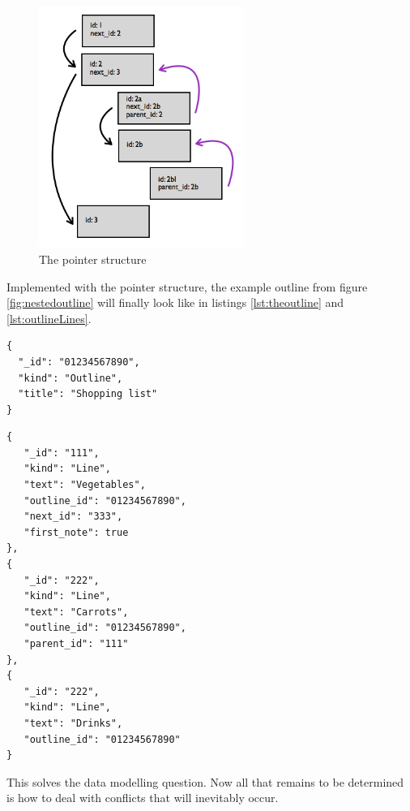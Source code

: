 \medskip
\begin{figure}[H] 
  \begin{center}
    \includegraphics[width=0.6\textwidth]{grafik/pointer} 
  \end{center}
  \caption{The pointer structure}
  \label{fig:pointer}
\end{figure}


Implemented with the pointer structure, the example outline from figure \ref{fig:nestedoutline} will finally look like in listings \ref{lst:theoutline} and \ref{lst:outlineLines}. 

\medskip
\begin{lstlisting}[caption=Chosen implementation of an outline, label={lst:theoutline}]
{
  "_id": "01234567890",
  "kind": "Outline",
  "title": "Shopping list"
}
\end{lstlisting}



\medskip
\begin{lstlisting}[caption=Chosen implementation of three lines, label={lst:outlineLines}]
{
   "_id": "111",
   "kind": "Line",
   "text": "Vegetables",
   "outline_id": "01234567890",
   "next_id": "333",
   "first_note": true
},
{
   "_id": "222",
   "kind": "Line",
   "text": "Carrots",
   "outline_id": "01234567890",
   "parent_id": "111"
},
{
   "_id": "222",
   "kind": "Line",
   "text": "Drinks",
   "outline_id": "01234567890"
}
\end{lstlisting}

This solves the data modelling question. Now all that remains to be determined is how to deal with conflicts that will inevitably occur.

